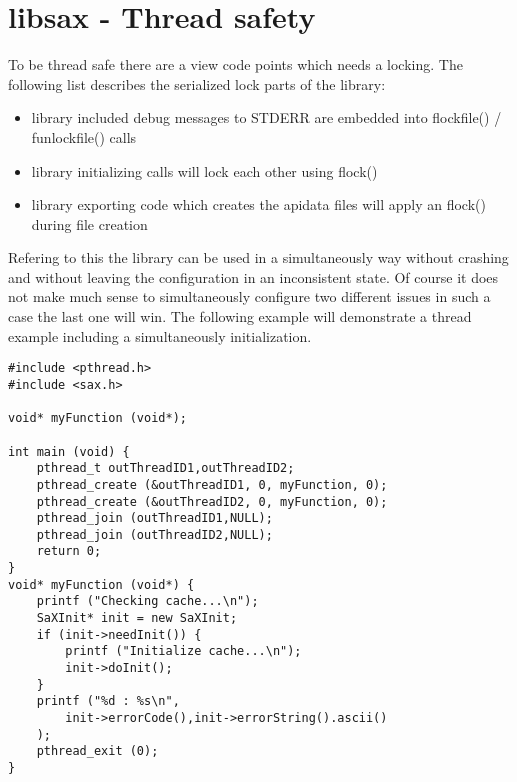 \chapter{libsax - Thread safety}

To be thread safe there are a view code points which needs a
locking. The following list describes the serialized lock parts of
the library:

\begin{itemize}
\item library included debug messages to STDERR are embedded into
      flockfile() / funlockfile() calls
\item library initializing calls will lock each other using flock()
\item library exporting code which creates the apidata files
      will apply an flock() during file creation
\end{itemize}

Refering to this the library can be used in a simultaneously
way without crashing and without leaving the configuration in an
inconsistent state. Of course it does not make much sense to
simultaneously configure two different issues in such a case the
last one will win. The following example will demonstrate a thread
example including a simultaneously initialization.

\begin{Command}{12cm}
\begin{small}
\begin{verbatim}
#include <pthread.h>
#include <sax.h>

void* myFunction (void*);

int main (void) {
    pthread_t outThreadID1,outThreadID2;
    pthread_create (&outThreadID1, 0, myFunction, 0);
    pthread_create (&outThreadID2, 0, myFunction, 0);
    pthread_join (outThreadID1,NULL);
    pthread_join (outThreadID2,NULL);
    return 0;
}
void* myFunction (void*) {
    printf ("Checking cache...\n");
    SaXInit* init = new SaXInit;
    if (init->needInit()) {
        printf ("Initialize cache...\n");
        init->doInit();
    }
    printf ("%d : %s\n",
        init->errorCode(),init->errorString().ascii()
    );
    pthread_exit (0);
}
\end{verbatim}
\end{small}
\end{Command}
